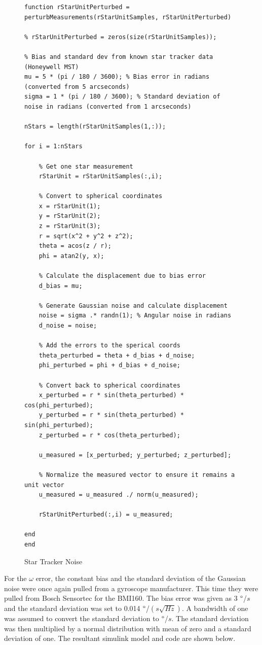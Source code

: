\begin{figure} [H]
    \centering
    \begin{lstlisting}
function rStarUnitPerturbed = perturbMeasurements(rStarUnitSamples, rStarUnitPerturbed)

% rStarUnitPerturbed = zeros(size(rStarUnitSamples));

% Bias and standard dev from known star tracker data (Honeywell MST)
mu = 5 * (pi / 180 / 3600); % Bias error in radians (converted from 5 arcseconds)
sigma = 1 * (pi / 180 / 3600); % Standard deviation of noise in radians (converted from 1 arcseconds)

nStars = length(rStarUnitSamples(1,:));

for i = 1:nStars

    % Get one star measurement
    rStarUnit = rStarUnitSamples(:,i);

    % Convert to spherical coordinates
    x = rStarUnit(1);
    y = rStarUnit(2); 
    z = rStarUnit(3);
    r = sqrt(x^2 + y^2 + z^2);
    theta = acos(z / r);
    phi = atan2(y, x);
    
    % Calculate the displacement due to bias error
    d_bias = mu;
    
    % Generate Gaussian noise and calculate displacement
    noise = sigma .* randn(1); % Angular noise in radians
    d_noise = noise;
    
    % Add the errors to the sperical coords
    theta_perturbed = theta + d_bias + d_noise;
    phi_perturbed = phi + d_bias + d_noise;
    
    % Convert back to spherical coordinates
    x_perturbed = r * sin(theta_perturbed) * cos(phi_perturbed);
    y_perturbed = r * sin(theta_perturbed) * sin(phi_perturbed);
    z_perturbed = r * cos(theta_perturbed);
    
    u_measured = [x_perturbed; y_perturbed; z_perturbed];
    
    % Normalize the measured vector to ensure it remains a unit vector
    u_measured = u_measured ./ norm(u_measured);

    rStarUnitPerturbed(:,i) = u_measured;
    
end
end
    \end{lstlisting}
    \caption{Star Tracker Noise}
    \label{fig:starTrackerNoise}
\end{figure}

For the $\omega$ error, the constant bias and the standard deviation of the Gaussian noise were once again pulled from a gyroscope manufacturer. This time they were pulled from Bosch Sensortec for the BMI160. The bias error was given as 3 $\degree$/$s$ and the standard deviation was set to  0.014 $\degree$/$\left(s \sqrt{Hz}\right)$. A bandwidth of one was assumed to convert the standard deviation to $\degree$/$s$. The standard deviation was then multiplied by a normal distribution with mean of zero and a standard deviation of one. The resultant simulink model and code are shown below.

